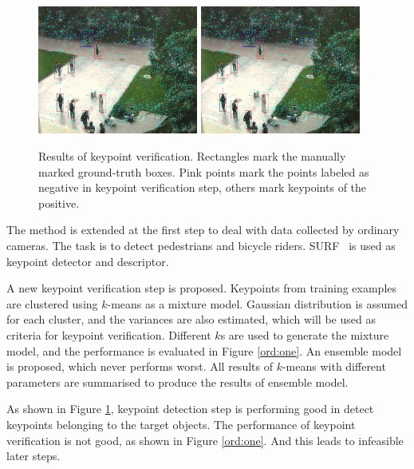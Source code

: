 \begin{figure}
{
\includegraphics[width=0.47\textwidth,bb=0 0 720 576]{frame92_af.jpg}
}
{
\includegraphics[width=0.47\textwidth,bb=0 0 720 576]{frame92_af.jpg}
}\\

\caption[Keypoint verification]{Results of keypoint verification. Rectangles mark the manually marked ground-truth boxes. Pink points mark the points labeled as negative in keypoint verification step, others mark keypoints of the positive. }
\label{ord:two}
\end{figure}
The method is extended at the first step to deal with data collected by ordinary cameras. The task is to detect pedestrians and bicycle riders. SURF~\citep{surf} is used as keypoint detector and descriptor.

A new keypoint verification step is proposed. Keypoints from training examples are clustered using $k$-means as a mixture model. Gaussian distribution is assumed for each cluster, and the variances are also estimated, which will be used as criteria for keypoint verification. Different $k$s are used to generate the mixture model, and the performance is evaluated in Figure \ref{ord:one}.  An ensemble model is proposed, which never performs worst. All results of $k$-means with different parameters are summarised to produce the results of ensemble model.

As shown in Figure \ref{ord:two}, keypoint detection step is performing good in detect keypoints belonging to the target objects. The performance of keypoint verification is not good, as shown in Figure \ref{ord:one}. And this leads to infeasible later steps.

